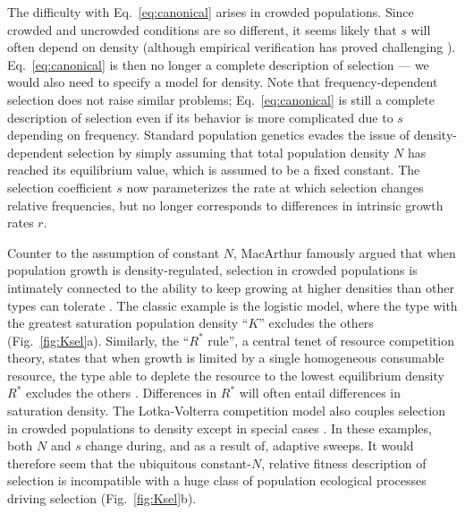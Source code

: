 \documentclass[11pt]{article}
\begin{document}
The difficulty with Eq.~\eqref{eq:canonical} arises in crowded populations. Since crowded and uncrowded conditions are so different, it seems likely that $s$ will often depend on density (although empirical verification has proved challenging \citep{travis_2013}). Eq.~\eqref{eq:canonical} is then no longer a complete description of selection --- we would also need to specify a model for density. Note that frequency-dependent selection does not raise similar problems; Eq.~\eqref{eq:canonical} is still a complete description of selection even if its behavior is more complicated due to $s$ depending on frequency. Standard population genetics evades the issue of density-dependent selection by simply assuming that total population density $N$ has reached its equilibrium value, which is assumed to be a fixed constant. The selection coefficient $s$ now parameterizes the rate at which selection changes relative frequencies, but no longer corresponds to differences in intrinsic growth rates $r$. 

Counter to the assumption of constant $N$, MacArthur famously argued that when population growth is density-regulated, selection in crowded populations is intimately connected to the ability to keep growing at higher densities than other types can tolerate \citep{macarthur_1967}. The classic example is the logistic model, where the type with the greatest saturation population density ``$K$'' excludes the others (Fig.~\ref{fig:Ksel}a). Similarly, the ``$R^*$ rule'', a central tenet of resource competition theory, states that when growth is limited by a single homogeneous consumable resource, the type able to deplete the resource to the lowest equilibrium density $R^*$ excludes the others \citep{grover_1997}. Differences in $R^*$ will often entail differences in saturation density. The Lotka-Volterra competition model also couples selection in crowded populations to density except in special cases \citep{smouse_1976,mallet_2012}. In these examples, both $N$ and $s$ change during, and as a result of, adaptive sweeps. It would therefore seem that the ubiquitous constant-$N$, relative fitness description of selection is incompatible with a huge class of population ecological processes driving selection (Fig.~\ref{fig:Ksel}b).
\end{document}
